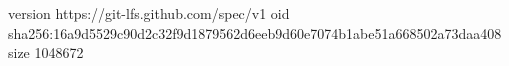 version https://git-lfs.github.com/spec/v1
oid sha256:16a9d5529c90d2c32f9d1879562d6eeb9d60e7074b1abe51a668502a73daa408
size 1048672
